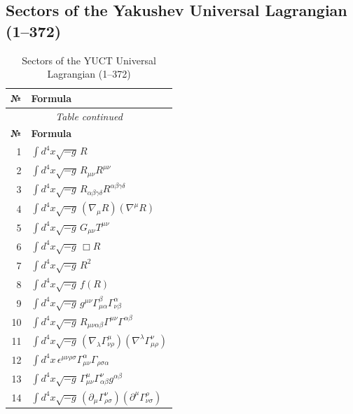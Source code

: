 \documentclass[12pt,a4paper]{article}
\begin{document}
	\subsection{Sectors of the Yakushev Universal Lagrangian (1–372)}
	\label{sec:sectors}
	
	\scriptsize
\begin{longtable}{r p{}}
	\caption{Sectors of the YUCT Universal Lagrangian (1–372)}\label{tab:sectors-372}\\
	\toprule
	\textbf{№} & \textbf{Formula} \\
	\midrule
	\endfirsthead
	\multicolumn{2}{c}{\textit{Table continued}}\\
	\toprule
	\textbf{№} & \textbf{Formula} \\
	\midrule
	\endhead
	\bottomrule
	\endfoot
	1 & \(\displaystyle \int d^4x\sqrt{-g}\,R\) \\
	2 & \(\displaystyle \int d^4x\sqrt{-g}\,R_{\mu\nu}R^{\mu\nu}\) \\
	3 & \(\displaystyle \int d^4x\sqrt{-g}\,R_{\alpha\beta\gamma\delta}R^{\alpha\beta\gamma\delta}\) \\
	4 & \(\displaystyle \int d^4x\sqrt{-g}\,(\nabla_\mu R)(\nabla^\mu R)\) \\
	5 & \(\displaystyle \int d^4x\sqrt{-g}\,G_{\mu\nu}T^{\mu\nu}\) \\
	6 & \(\displaystyle \int d^4x\sqrt{-g}\,\Box R\) \\
	7 & \(\displaystyle \int d^4x\sqrt{-g}\,R^2\) \\
	8 & \(\displaystyle \int d^4x\sqrt{-g}\,f(R)\) \\
	9 & \(\displaystyle \int d^4x\sqrt{-g}\,g^{\mu\nu}\Gamma^{\beta}_{\mu\alpha}\Gamma^{\alpha}_{\nu\beta}\) \\
	10 & \(\displaystyle \int d^4x\sqrt{-g}\,R_{\mu\nu\alpha\beta}\Gamma^{\mu\nu}\Gamma^{\alpha\beta}\) \\
	11 & \(\displaystyle \int d^4x\sqrt{-g}\,(\nabla_\lambda\Gamma^{\mu}_{\nu\rho})(\nabla^\lambda\Gamma^{\nu}_{\mu\rho})\) \\
	12 & \(\displaystyle \int d^4x\,\epsilon^{\mu\nu\rho\sigma}\Gamma^{\alpha}_{\mu\nu}\Gamma_{\rho\sigma\alpha}\) \\
	13 & \(\displaystyle \int d^4x\sqrt{-g}\,\Gamma^{\mu}_{\mu\nu}\Gamma^{\nu}_{\alpha\beta}g^{\alpha\beta}\) \\
	14 & \(\displaystyle \int d^4x\sqrt{-g}\,(\partial_\mu\Gamma^{\nu}_{\rho\sigma})(\partial^\mu\Gamma^{\rho}_{\nu\sigma})\) \\

\end{longtable}
\end{document}
